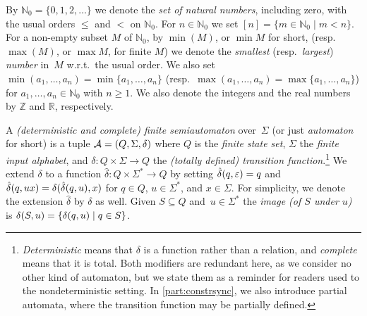 \label{def:N0} 
\label{def:finite_set_n}  
\label{def:min} 
\label{def:max} 
By $\mathbb N_0 = \{ 0,1,2,\ldots \}$
we denote the \emph{set of natural numbers}, including zero,
with the usual orders $\le$ and $<$ on $\mathbb N_0$.
For $n \in \mathbb N_0$ we set $[n] = \{ m \in \mathbb N_0 \mid m < n \}$.
For a non-empty  subset $M$ of $\mathbb N_0$, 
by $\min(M)$, or $\min M$ for short, (resp.~$\max(M)$, or $\max M$, for finite $M$) 
we denote the \emph{smallest} (resp.~\emph{largest}) \emph{number} in~$M$ w.r.t.~the usual order.
We also set $\min(a_1, \ldots, a_n) = \min\{a_1, \ldots, a_n\}$ (resp.~$\max(a_1, \ldots, a_n) = \max\{a_1, \ldots,a_n\}$)
for $a_1, \ldots, a_n \in \mathbb N_0$ with $n \ge 1$.
We also denote the integers and the real numbers by $\mathbb Z$ and $\mathbb R$, respectively.
\label{def:integers}
\label{def:realnumbers}

\label{def:automaton}
A \emph{(deterministic and complete) finite semiautomaton} over~$\Sigma$ (or just \emph{automaton} for short) is a tuple $\mathcal A = (Q, \Sigma, \delta)$
where $Q$ is the \emph{finite state set}, $\Sigma$ the \emph{finite input alphabet},
and $\delta \colon Q \times \Sigma \to Q$ the \emph{(totally defined) transition function}.\footnote{\emph{Deterministic} means that $\delta$ is a function rather than a
	relation, and \emph{complete} means that it is total. Both modifiers are
	redundant here, as we consider no other kind of automaton, but we state
	them as a reminder for readers used to the nondeterministic setting. In
	\cref{part:constrsync}, we also introduce partial automata, where the
	transition function may be partially defined.%
	}
We extend $\delta$ to a function $\hat\delta \colon Q \times \Sigma^* \to Q$
by setting $\hat\delta(q,\varepsilon) = q$
and $\hat\delta(q,ux) = \delta(\hat\delta(q,u),x)$
for $q \in Q$, $u \in \Sigma^*$, and $x \in \Sigma$. For simplicity, we denote the extension $\hat\delta$ 
by $\delta$ as well. Given $S \subseteq Q$ and~$u \in \Sigma^*$ the \emph{image (of $S$ under $u$)} is $\delta(S,u) = \{ \delta(q,u) \mid q \in S \}$. 
\label{def:image-delta}

